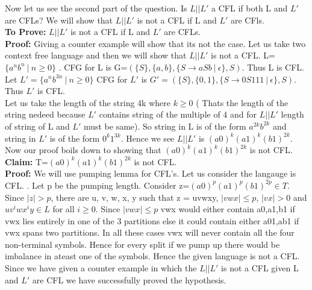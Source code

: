 \documentclass{article}
\begin{document}
\newline
Now let us see the second part of the question. Is $L||L'$ a CFL if both L and $L'$ are
CFLs? We will show that $L|| L'$ is not a CFL if L and $L'$ are CFls. \\
\textbf{To Prove:} $L|| L'$ is not a CFL if L and $L'$ are CFLs. \\
\textbf{Proof:} Giving a counter example will show that its not the case. Let us take two context free language and then we will show that $L || L'$ is not a CFL. L=$\{a^nb^n \ | \ n \geq 0\}$ . CFG for L is G=$(\{S\},\{a,b\},\{S \rightarrow aSb \ | \ \epsilon\},S)$. Thus L is CFL. Let $ L'=\{a^nb^{3n} \ | \ n \geq 0\}$ CFG for $L'$ is $G' =(\{S\},\{0,1\},\{S \rightarrow 0S111 \ | \ \epsilon\},S)$. Thus $L'$ is CFL.\\
Let us take the length of the string 4k where $k \geq 0$ ( Thats the length of the string nedeed because $L'$ contains string of the multiple of 4 and for $L || L'$ length of string of L and $L'$ must be same). So string in L is of the form $a^{2k}b^{2k}$ and string in $L' $ is of the form $0^{k}1^{3k}$. Hence we see $L || L'$ is $(a0)^k (a1)^k (b1)^{2k}$. Now our proof boils down to showing that $(a0)^k (a1)^k (b1)^{2k}$ is not CFL.\\
\textbf{Claim:} T=$(a0)^k (a1)^k (b1)^{2k}$ is not CFL.\\
\textbf{Proof:} We will use pumping lemma for CFL's. Let us consider the langauge is CFL. . Let p be the pumping length. Consider z=$(a0)^p (a1)^p (b1)^{2p} \in T$. Since $|z| > p$, there are u, v, w, x, y such that z = uvwxy, $|vwx| \leq p$, $|vx| > 0$ and $ uv^{i}wx^{i}y \in L$ for all $i \geq 0$. Since $|vwx| \leq p$ vwx would either contain a0,a1,b1 if vwx lies entirely in one of the 3 partitions else it could contain either a01,ab1 if vwx spans two partitions. In all these cases vwx will never contain all the four non-terminal symbols. Hence for every split if we pump up there would be imbalance in ateast one of the symbols. Hence the given language is not a CFL. \\
\newline
Since we have given a counter example in which the $L||L'$ is not a CFL given L and $L'$ are CFL we have successfully proved the hypothesis. 


\pagebreak
\end{document}
